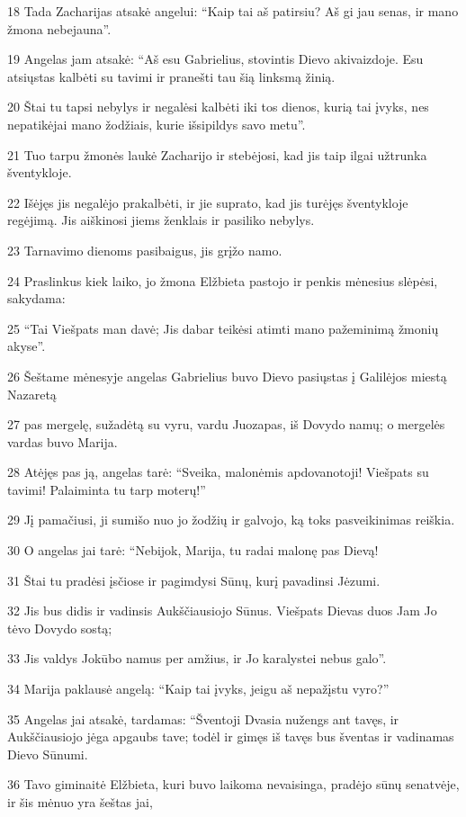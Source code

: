 \par 18 Tada Zacharijas atsakė angelui: “Kaip tai aš patirsiu? Aš gi jau senas, ir mano žmona nebejauna”. 
\par 19 Angelas jam atsakė: “Aš esu Gabrielius, stovintis Dievo akivaizdoje. Esu atsiųstas kalbėti su tavimi ir pranešti tau šią linksmą žinią. 
\par 20 Štai tu tapsi nebylys ir negalėsi kalbėti iki tos dienos, kurią tai įvyks, nes nepatikėjai mano žodžiais, kurie išsipildys savo metu”. 
\par 21 Tuo tarpu žmonės laukė Zacharijo ir stebėjosi, kad jis taip ilgai užtrunka šventykloje. 
\par 22 Išėjęs jis negalėjo prakalbėti, ir jie suprato, kad jis turėjęs šventykloje regėjimą. Jis aiškinosi jiems ženklais ir pasiliko nebylys. 
\par 23 Tarnavimo dienoms pasibaigus, jis grįžo namo. 
\par 24 Praslinkus kiek laiko, jo žmona Elžbieta pastojo ir penkis mėnesius slėpėsi, sakydama: 
\par 25 “Tai Viešpats man davė; Jis dabar teikėsi atimti mano pažeminimą žmonių akyse”. 
\par 26 Šeštame mėnesyje angelas Gabrielius buvo Dievo pasiųstas į Galilėjos miestą Nazaretą 
\par 27 pas mergelę, sužadėtą su vyru, vardu Juozapas, iš Dovydo namų; o mergelės vardas buvo Marija. 
\par 28 Atėjęs pas ją, angelas tarė: “Sveika, malonėmis apdovanotoji! Viešpats su tavimi! Palaiminta tu tarp moterų!” 
\par 29 Jį pamačiusi, ji sumišo nuo jo žodžių ir galvojo, ką toks pasveikinimas reiškia. 
\par 30 O angelas jai tarė: “Nebijok, Marija, tu radai malonę pas Dievą! 
\par 31 Štai tu pradėsi įsčiose ir pagimdysi Sūnų, kurį pavadinsi Jėzumi. 
\par 32 Jis bus didis ir vadinsis Aukščiausiojo Sūnus. Viešpats Dievas duos Jam Jo tėvo Dovydo sostą; 
\par 33 Jis valdys Jokūbo namus per amžius, ir Jo karalystei nebus galo”. 
\par 34 Marija paklausė angelą: “Kaip tai įvyks, jeigu aš nepažįstu vyro?” 
\par 35 Angelas jai atsakė, tardamas: “Šventoji Dvasia nužengs ant tavęs, ir Aukščiausiojo jėga apgaubs tave; todėl ir gimęs iš tavęs bus šventas ir vadinamas Dievo Sūnumi. 
\par 36 Tavo giminaitė Elžbieta, kuri buvo laikoma nevaisinga, pradėjo sūnų senatvėje, ir šis mėnuo yra šeštas jai, 
